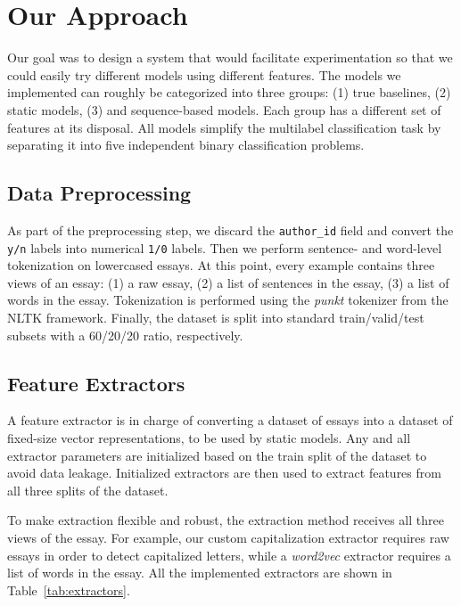 \documentclass[10pt, a4paper]{article}
\begin{document}
\section{Our Approach}
Our goal was to design a system that would facilitate experimentation so that we could easily try different models using different features. The models we implemented can roughly be categorized into three groups: (1) true baselines, (2) static models, (3) and sequence-based models. Each group has a different set of features at its disposal. All models simplify the multilabel classification task by separating it into five independent binary classification problems. 

\subsection{Data Preprocessing}
As part of the preprocessing step, we discard the \texttt{author\_id} field and convert the \texttt{y/n} labels into numerical \texttt{1/0} labels. Then we perform sentence- and word-level tokenization on lowercased essays. At this point, every example contains three views of an essay: (1) a raw essay, (2) a list of sentences in the essay, (3) a list of words in the essay. Tokenization is performed using the \textit{punkt} tokenizer from the NLTK %
framework. Finally, the dataset is split into standard train/valid/test subsets with a 60/20/20 ratio, respectively.

\subsection{Feature Extractors}
\label{ssec-featex}
A feature extractor is in charge of converting a dataset of essays into a dataset of fixed-size vector representations, to be used by static models. Any and all extractor parameters are initialized based on the train split of the dataset to avoid data leakage. Initialized extractors are then used to extract features from all three splits of the dataset. 

To make extraction flexible and robust, the extraction method receives all three views of the essay. For example, our custom   capitalization extractor requires raw essays in order to detect capitalized letters, while a \textit{word2vec} extractor requires a list of words in the essay. All the implemented extractors are shown in Table~\ref{tab:extractors}.
\end{document}
